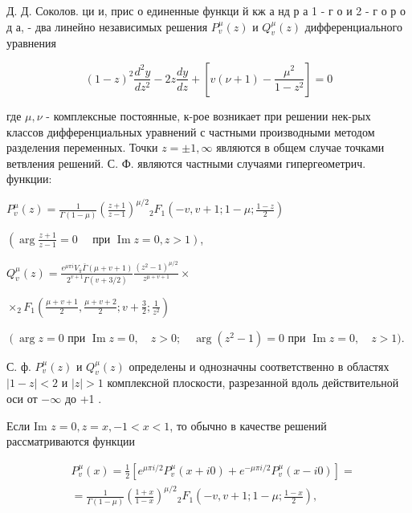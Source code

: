 \documentclass[10pt]{article}
\begin{document}
Д. Д. Соколов. ци и, прис о единенные функци й кж а нд р а 1 - г о и 2 - г о р о д а, - два линейно независимых решения $P_{v}^{\mu}(z)$ и $Q_{v}^{\mu}(z)$ дифференциального уравнения



\[

(1-z)^{2} \frac{d^{2} y}{d z^{2}}-2 z \frac{d y}{d z}+\left[v(\nu+1)-\frac{\mu^{2}}{1-z^{2}}\right]=0

\]



где $\mu, \nu$ - комплексные постоянные, к-рое возникает при решении нек-рых классов дифференциальных уравнений с частными производными методом разделения переменных. Точки $z= \pm 1, \infty$ являются в общем случае точками ветвления решений. С. Ф. являются частными случаями гипергеометрич. функции:



$P_{v}^{\mu}(z)=\frac{1}{\Gamma(1-\mu)}\left(\frac{z+1}{z-1}\right)^{\mu / 2}{ }_{2} F_{1}\left(-v, v+1 ; 1-\mu ; \frac{1-z}{2}\right)$



$\left(\arg \frac{z+1}{z-1}=0 \quad\right.$ при $\left.\operatorname{Im} z=0, z>1\right)$,



$Q_{v}^{\mu}(z)=\frac{e^{\mu \pi i} V_{\bar{\pi}} \bar{\Gamma}(\mu+v+1)}{2^{v+1} \Gamma(v+3 / 2)} \frac{\left(z^{2}-1\right)^{\mu / 2}}{z^{\mu+v+1}} \times$



$\times_{2} F_{1}\left(\frac{\mu+v+1}{2}, \frac{\mu+v+2}{2} ; v+\frac{3}{2} ; \frac{1}{z^{2}}\right)$



$\left(\arg z=0\right.$ при $\operatorname{Im} z=0, \quad z>0 ; \quad \arg \left(z^{2}-1\right)=0$ при $\operatorname{Im} z=0, \quad z>1)$.



С. ф. $P_{v}^{\mu}(z)$ и $Q_{v}^{\mu}(z)$ определены и однозначны соответственно в областях $|1-z|<2$ и $|z|>1$ комплексной плоскости, разрезанной вдоль действительной оси от $-\infty$ до +1 .



Если Im $z=0, z=x,-1<x<1$, то обычно в качестве решений рассматриваются функции



\[

\begin{aligned}

& P_{v}^{\mu}(x)=\frac{1}{2}\left[e^{\mu \pi i / 2} P_{v}^{\mu}(x+i 0)+e^{-\mu \pi i / 2} P_{v}^{\mu}(x-i 0)\right]= \\

& =\frac{1}{\Gamma(1-\mu)}\left(\frac{1+x}{1-x}\right)^{\mu / 2}{ }_{2} F_{1}\left(-v, v+1 ; 1-\mu ; \frac{1-x}{2}\right),

\end{aligned}

\]
\end{document}
